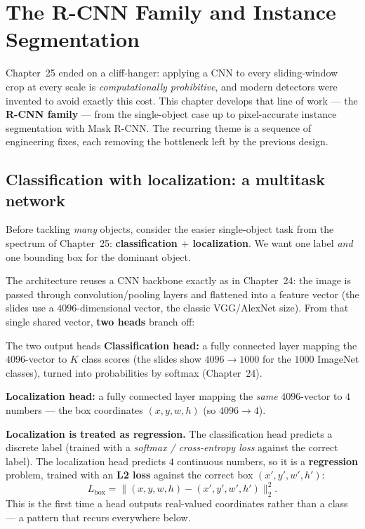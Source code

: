 \documentclass{report}
\begin{document}
\chapter{The R-CNN Family and Instance Segmentation}

Chapter~25 ended on a cliff-hanger: applying a CNN to every sliding-window crop
at every scale is \emph{computationally prohibitive}, and modern detectors were
invented to avoid exactly this cost. This chapter develops that line of work ---
the \textbf{R-CNN family} --- from the single-object case up to pixel-accurate
instance segmentation with Mask R-CNN. The recurring theme is a sequence of
engineering fixes, each removing the bottleneck left by the previous design.

\section{Classification with localization: a multitask network}

Before tackling \emph{many} objects, consider the easier single-object task
from the spectrum of Chapter~25: \textbf{classification $+$ localization}. We
want one label \emph{and} one bounding box for the dominant object.

The architecture reuses a CNN backbone exactly as in Chapter~24: the image is
passed through convolution/pooling layers and flattened into a feature vector
(the slides use a $4096$-dimensional vector, the classic VGG/AlexNet size).
From that single shared vector, \textbf{two heads} branch off:

\begin{defbox}{The two output heads}
\textbf{Classification head:} a fully connected layer mapping the $4096$-vector
to $K$ class scores (the slides show $4096 \to 1000$ for the $1000$ ImageNet
classes), turned into probabilities by softmax (Chapter~24).

\medskip
\textbf{Localization head:} a fully connected layer mapping the \emph{same}
$4096$-vector to $4$ numbers --- the box coordinates $(x,y,w,h)$ (so
$4096 \to 4$).
\end{defbox}

\begin{keybox}
\textbf{Localization is treated as regression.} The classification head
predicts a discrete label (trained with a \emph{softmax / cross-entropy loss}
against the correct label). The localization head predicts $4$ continuous
numbers, so it is a \textbf{regression} problem, trained with an \textbf{L2
loss} against the correct box $(x',y',w',h')$:
\[
L_{\text{box}} = \lVert (x,y,w,h) - (x',y',w',h') \rVert_2^2 .
\]
This is the first time a head outputs real-valued coordinates rather than a
class --- a pattern that recurs everywhere below.
\end{keybox}
\end{document}
